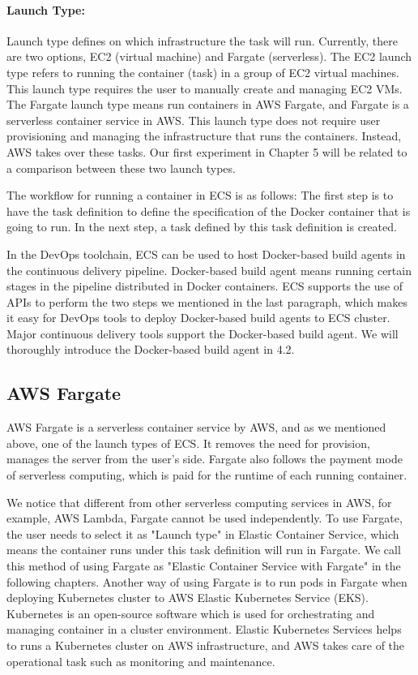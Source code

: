 \paragraph{Launch Type:} Launch type defines on which infrastructure the task will run. Currently, there are two options, EC2 (virtual machine) and Fargate (serverless). The EC2 launch type refers to running the container (task) in a group of EC2 virtual machines. This launch type requires the user to manually create and managing EC2 VMs. The Fargate launch type means run containers in AWS Fargate, and Fargate is a serverless container service in AWS. This launch type does not require user provisioning and managing the infrastructure that runs the containers. Instead, AWS takes over these tasks. Our first experiment in Chapter 5 will be related to a comparison between these two launch types.
\par
The workflow for running a container in ECS is as follows:
The first step is to have the task definition to define the specification of the Docker container that is going to run. In the next step, a task defined by this task definition is created.
\par
In the DevOps toolchain, ECS can be used to host Docker-based build agents in the continuous delivery pipeline. Docker-based build agent means running certain stages in the pipeline distributed in Docker containers. 
ECS supports the use of APIs to perform the two steps we mentioned in the last paragraph, which makes it easy for DevOps tools to deploy Docker-based build agents to ECS cluster.
Major continuous delivery tools support the Docker-based build agent. 
We will thoroughly introduce the Docker-based build agent in 4.2.
\subsection{AWS Fargate}
AWS Fargate is a serverless container service by AWS, and as we mentioned above, one of the launch types of ECS. It removes the need for provision, manages the server from the user's side. Fargate also follows the payment mode of serverless computing, which is paid for the runtime of each running container. 
\par
We notice that different from other serverless computing services in AWS, for example, AWS Lambda, Fargate cannot be used independently. To use Fargate, the user needs to select it as "Launch type" in Elastic Container Service, which means the container runs under this task definition will run in Fargate. We call this method of using Fargate as "Elastic Container Service with Fargate" in the following chapters. Another way of using Fargate is to run pods in Fargate when deploying Kubernetes cluster to AWS Elastic Kubernetes Service (EKS). Kubernetes is an open-source software which is used for orchestrating and managing container in a cluster environment. Elastic Kubernetes Services helps to runs a Kubernetes cluster on AWS infrastructure, and AWS takes care of the operational task such as monitoring and maintenance. 

